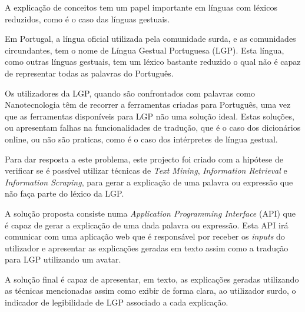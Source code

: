 \begin{abstractotherlanguage}
   A explicação de conceitos tem um papel importante em línguas com léxicos reduzidos, como é o caso das línguas gestuais.

    Em Portugal, a língua oficial utilizada pela comunidade surda, e as comunidades circundantes, tem o nome de Língua Gestual Portuguesa (LGP).
    Esta língua, como outras línguas gestuais, tem um léxico bastante reduzido o qual não é capaz de representar todas as palavras do Português.

    Os utilizadores da LGP, quando são confrontados com palavras como Nanotecnologia têm de recorrer a ferramentas criadas para Português, uma vez que as ferramentas disponíveis para LGP não uma solução ideal.
    Estas soluções, ou apresentam falhas na funcionalidades de tradução, que é o caso dos dicionários online, ou não são praticas, como é o caso dos intérpretes de língua gestual.

    Para dar resposta a este problema, este projecto foi criado com a hipótese de verificar se é possível utilizar técnicas de \textit{Text Mining}, \textit{Information Retrieval} e \textit{Information Scraping}, para gerar a explicação de uma palavra ou expressão que não faça parte do léxico da LGP.

    A solução proposta consiste numa \textit{Application Programming Interface} (API) que é capaz de gerar a explicação de uma dada palavra ou expressão.
    Esta API irá comunicar com uma aplicação web que é responsável por receber os \textit{inputs} do utilizador e apresentar as explicações geradas em texto assim como a tradução para LGP utilizando um avatar.

    A solução final é capaz de apresentar, em texto, as explicações geradas utilizando as técnicas mencionadas assim como exibir de forma clara, ao utilizador surdo, o indicador de legibilidade de LGP associado a cada explicação.

\end{abstractotherlanguage}


\begin{acknowledgements}

\end{acknowledgements}


